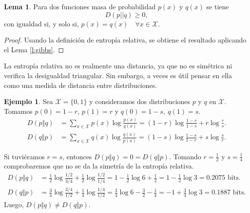 \documentclass[10pt,a4paper]{article} %
\theoremstyle{definition}
\newtheorem{lemma}[theorem]{Lema}
\newtheorem{example}[theorem]{Ejemplo}
\begin{document}
\begin{lemma}\label{l:ent_rel_pos}
  Para dos funciones masa de probabilidad $p(x)$ y $q(x)$ se tiene \[
  D(p||q) \ge 0,\]
  con igualdad si, y solo si, $p(x) = q(x) \quad \forall x \in \mathcal{X}$.
\end{lemma}
\begin{proof}
  Usando la definición de entropía relativa, se obtiene el resultado aplicando el Lema \ref{l:gibbs}.
\end{proof}

La entropía relativa no es realmente una distancia, ya que no es simétrica ni verifica la desigualdad triangular. Sin embargo, a veces es útil pensar en ella como una medida de distancia entre distribuciones.

\begin{example}
  Sea $\mathcal{X} = \{0,1\}$ y consideramos dos distribuciones $p$ y $q$ en $\mathcal{X}$. Tomamos $p(0) = 1-r$, $p(1) = r$ y $q(0) = 1-s,\ q(1) = s$.
  \begin{align*}
    D(p \Vert q) &= \sum_{x \in \mathcal{X}} p(x) \log \frac{p(x)}{q(x)} = (1 - r) \log \frac{1-r}{1-s} + r \log \frac{r}{s}.\\
    D(q \Vert p) &= \sum_{x \in \mathcal{X}}q(x) \log \frac{q(x)}{p(x)} = (1-s) \log \frac{1-s}{1-r} + s \log \frac{s}{r}.
  \end{align*}

  Si tuviéramos $r=s$, entonces $D(p \Vert q) = 0 = D(q \Vert p)$.
  Tomando $r = \frac{1}{2}$ y $s = \frac{1}{4}$ comprobaremos que no se da la simetría de la entropía relativa.
  \begin{align*}
    D(p \Vert q) &= \frac{1}{2} \log \frac{1/2}{3/4} + \frac{1}{2} \log \frac{1/2}{1/4} = 1 - \frac{1}{2} \log 6 + \frac{1}{2} = 1 - \frac{1}{2} \log 3 = 0.2075 \text{ bits}.\\
    D(q \Vert p) &= \frac{3}{4} \log \frac{3/4}{1/2} + \frac{1}{4} \log \frac{1/4}{1/2} = \frac{3}{4} \log 6 - \frac{3}{2} - \frac{1}{4} = -1 + \frac{3}{4} \log 3 = 0.1887 \text{ bits}. %
  \end{align*}
Luego, $D(p\Vert q) \ne D(q \Vert p)$.
\end{example}
\end{document}
